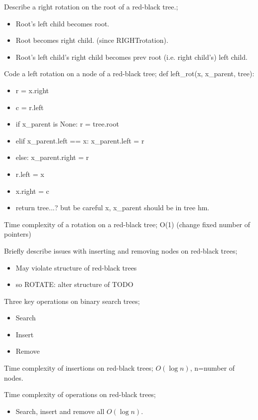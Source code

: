 \documentclass{article}
\begin{document}
Describe a right rotation on the root of a red-black tree.; \begin{itemize} \item Root's left child becomes root.  \item Root becomes right child. (since RIGHTrotation).  \item Root's left child's right child becomes prev root (i.e. right child's) left child.  \end{itemize}

Code a left rotation on a node of a red-black tree; def left\_rot(x, x\_parent, tree):\begin{itemize} \item r = x.right \item c = r.left \item if x\_parent is None: r = tree.root \item elif x\_parent.left == x: x\_parent.left = r \item else: x\_parent.right = r \item r.left = x \item x.right = c \item return tree...? but be careful x, x\_parent should be in tree hm.  \end{itemize}

Time complexity of a rotation on a red-black tree; O(1) (change fixed number of pointers)

Briefly describe issues with inserting and removing nodes on red-black trees; \begin{itemize} \item May violate structure of red-black trees \item so ROTATE: alter structure of TODO\end{itemize}

Three key operations on binary search trees; \begin{itemize} \item Search \item Insert \item Remove \end{itemize}

Time complexity of insertions on red-black trees; $O(\log n)$, n=number of nodes.

Time complexity of operations on red-black trees; \begin{itemize} \item Search, insert and remove all $O(\log n)$.  \end{itemize}
\end{document}
